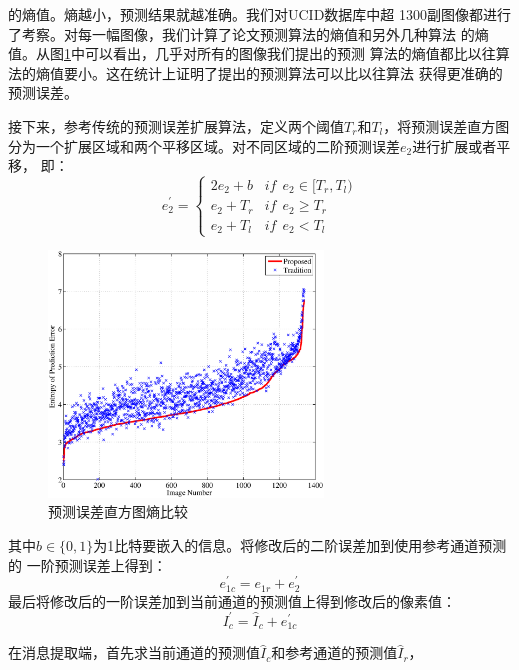 的熵值。熵越小，预测结果就越准确。我们对UCID数据库\cite{schaefer2003ucid}中超
1300副图像都进行了考察。对每一幅图像，我们计算了论文预测算法的熵值和另外几种算法
的熵值。从图\ref{fig:entropy_compare}中可以看出，几乎对所有的图像我们提出的预测
算法的熵值都比以往算法的熵值要小。这在统计上证明了提出的预测算法可以比以往算法
获得更准确的预测误差。
\par
接下来，参考传统的预测误差扩展算法，定义两个阈值$T_r$和$T_l$，将预测误差直方图
分为一个扩展区域和两个平移区域。对不同区域的二阶预测误差$e_2$进行扩展或者平移，
即：
\begin{equation}
  e_2^{'}=\left\{ \begin{array}{ll}
    2e_2+b & if~~e_2 \in [T_r,T_l)\\
    e_2+T_r & if~~e_2 \ge T_r\\
    e_2+T_l & if~~e_2<T_l
  \end{array} \right.
  \label{eq:second_pe_embedding}
\end{equation}
\begin{figure}
  \centering
  \includegraphics[width=0.65\textwidth]{figures/entropy_compare.eps}
  \caption{预测误差直方图熵比较}
  \label{fig:entropy_compare}
\end{figure}
其中$b\in\{0,1\}$为1比特要嵌入的信息。将修改后的二阶误差加到使用参考通道预测的
一阶预测误差上得到：
\begin{equation}
  e_{1c}^{'}=e_{1r}+e_2^{'}
  \label{eq:cur_first_pe_embedding}
\end{equation}
最后将修改后的一阶误差加到当前通道的预测值上得到修改后的像素值：
\begin{equation}
  I_c^{'}=\hat{I}_c+e_{1c}^{'}
  \label{eq:marked_pixel}
\end{equation}
\par
在消息提取端，首先求当前通道的预测值$\hat{I}_c$和参考通道的预测值$\hat{I}_r$，
